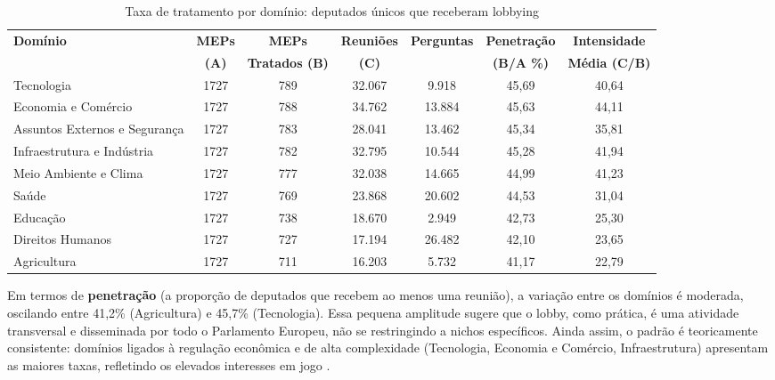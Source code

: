 \begin{table}[htbp]
    \centering
    \caption{Taxa de tratamento por domínio: deputados únicos que receberam lobbying}
    \label{tab:domain_treatment_rates}
    \begin{tabularx}{\textwidth}{>{\raggedright\arraybackslash}X c c c c c c}
        
        \hline
        \tiny{\textbf{Domínio}} & \tiny{\textbf{MEPs}} & \tiny{\textbf{MEPs}} & \tiny{\textbf{Reuniões}} & \tiny{\textbf{Perguntas}} & \tiny{\textbf{Penetração}} & \tiny{\textbf{Intensidade}} \\
        & \tiny{\textbf{(A)}} & \tiny{\textbf{Tratados (B)}} & \tiny{\textbf{(C)}} & \tiny{\textbf{}} & \tiny{\textbf{(B/A \%)}} & \tiny{\textbf{Média (C/B)}} \\
        \hline 
        \tiny{Tecnologia} & \tiny{1727} & \tiny{789} & \tiny{32.067} & \tiny{9.918} & \tiny{45,69} & \tiny{40,64} \\
        \tiny{Economia e Comércio} & \tiny{1727} & \tiny{788} & \tiny{34.762} & \tiny{13.884} & \tiny{45,63} & \tiny{44,11} \\
        \tiny{Assuntos Externos e Segurança} & \tiny{1727} & \tiny{783} & \tiny{28.041} & \tiny{13.462} & \tiny{45,34} & \tiny{35,81} \\
        \tiny{Infraestrutura e Indústria} & \tiny{1727} & \tiny{782} & \tiny{32.795} & \tiny{10.544} & \tiny{45,28} & \tiny{41,94} \\
        \tiny{Meio Ambiente e Clima} & \tiny{1727} & \tiny{777} & \tiny{32.038} & \tiny{14.665} & \tiny{44,99} & \tiny{41,23} \\
        \tiny{Saúde} & \tiny{1727} & \tiny{769} & \tiny{23.868} & \tiny{20.602} & \tiny{44,53} & \tiny{31,04} \\
        \tiny{Educação} & \tiny{1727} & \tiny{738} & \tiny{18.670} & \tiny{2.949} & \tiny{42,73} & \tiny{25,30} \\
        \tiny{Direitos Humanos} & \tiny{1727} & \tiny{727} & \tiny{17.194} & \tiny{26.482} & \tiny{42,10} & \tiny{23,65} \\
        \tiny{Agricultura} & \tiny{1727} & \tiny{711} & \tiny{16.203} & \tiny{5.732} & \tiny{41,17} & \tiny{22,79} \\
        \hline
        
    \end{tabularx}
\end{table}



Em termos de \textbf{penetração} (a proporção de deputados que recebem ao menos uma reunião), a variação entre os domínios é moderada, oscilando entre 41,2\% (Agricultura) e 45,7\% (Tecnologia). Essa pequena amplitude sugere que o lobby, como prática, é uma atividade transversal e disseminada por todo o Parlamento Europeu, não se restringindo a nichos específicos. Ainda assim, o padrão é teoricamente consistente: domínios ligados à regulação econômica e de alta complexidade (Tecnologia, Economia e Comércio, Infraestrutura) apresentam as maiores taxas, refletindo os elevados interesses em jogo \cite{mahoney_lobbying_2007}.

